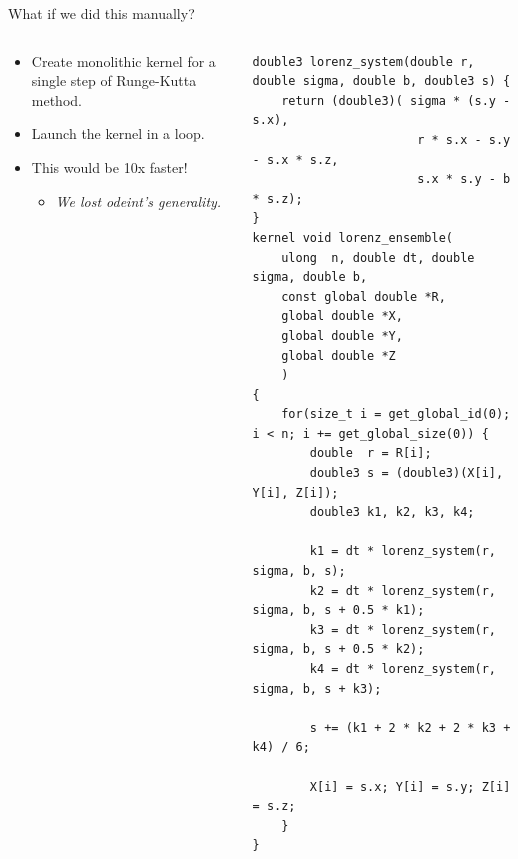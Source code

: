 \documentclass[@BEAMER_OPTIONS@]{beamer}
\begin{document}
\begin{frame}[fragile]{What if we did this manually?}
    \begin{columns}
        \begin{column}{0.45\textwidth}
            \begin{itemize}
                \item Create monolithic kernel for a single step of Runge-Kutta
                    method.
                \item Launch the kernel in a loop.
                    \vspace{\baselineskip}
                \item This would be 10x faster!
                    \begin{itemize}
                        \item<2|alert@2> \emph{We lost odeint's generality.}
                    \end{itemize}
            \end{itemize}
        \end{column} \quad \quad
        \begin{column}{0.5\textwidth}
            \begin{exampleblock}{}
                \begin{adjustbox}{width=0.95\textwidth,height=0.95\textheight,keepaspectratio}
                    \begin{lstlisting}
double3 lorenz_system(double r, double sigma, double b, double3 s) {
    return (double3)( sigma * (s.y - s.x),
                       r * s.x - s.y - s.x * s.z,
                       s.x * s.y - b * s.z);
}
kernel void lorenz_ensemble(
    ulong  n, double dt, double sigma, double b,
    const global double *R,
    global double *X,
    global double *Y,
    global double *Z
    )
{
    for(size_t i = get_global_id(0); i < n; i += get_global_size(0)) {
        double  r = R[i];
        double3 s = (double3)(X[i], Y[i], Z[i]);
        double3 k1, k2, k3, k4;

        k1 = dt * lorenz_system(r, sigma, b, s);
        k2 = dt * lorenz_system(r, sigma, b, s + 0.5 * k1);
        k3 = dt * lorenz_system(r, sigma, b, s + 0.5 * k2);
        k4 = dt * lorenz_system(r, sigma, b, s + k3);

        s += (k1 + 2 * k2 + 2 * k3 + k4) / 6;

        X[i] = s.x; Y[i] = s.y; Z[i] = s.z;
    }
}
                    \end{lstlisting}
                \end{adjustbox}
            \end{exampleblock}
        \end{column}
    \end{columns}
\end{frame}
\end{document}
